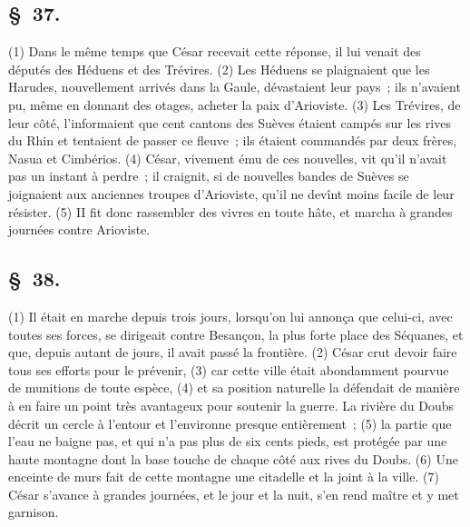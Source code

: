 \documentclass[french,twoside]{book} %
\begin{document}
\subsection[{§ 37.}]{ \textsc{§ 37.} }
\noindent (1) Dans le même temps que César recevait cette réponse, il lui venait des députés des Héduens et des Trévires. (2) Les Héduens se plaignaient que les Harudes, nouvellement arrivés dans la Gaule, dévastaient leur pays ; ils n’avaient pu, même en donnant des otages, acheter la paix d’Arioviste. (3) Les Trévires, de leur côté, l’informaient que cent cantons des Suèves étaient campés sur les rives du Rhin et tentaient de passer ce fleuve ; ils étaient commandés par deux frères, Nasua et Cimbérios. (4) César, vivement ému de ces nouvelles, vit qu’il n’avait pas un instant à perdre ; il craignit, si de nouvelles bandes de Suèves se joignaient aux anciennes troupes d’Arioviste, qu’il ne devînt moins facile de leur résister. (5) II fit donc rassembler des vivres en toute hâte, et marcha à grandes journées contre Arioviste.
\subsection[{§ 38.}]{ \textsc{§ 38.} }
\noindent (1) Il était en marche depuis trois jours, lorsqu’on lui annonça que celui-ci, avec toutes ses forces, se dirigeait contre Besançon, la plus forte place des Séquanes, et que, depuis autant de jours, il avait passé la frontière. (2) César crut devoir faire tous ses efforts pour le prévenir, (3) car cette ville était abondamment pourvue de munitions de toute espèce, (4) et sa position naturelle la défendait de manière à en faire un point très avantageux pour soutenir la guerre. La rivière du Doubs décrit un cercle à l’entour et l’environne presque entièrement ; (5) la partie que l’eau ne baigne pas, et qui n’a pas plus de six cents pieds, est protégée par une haute montagne dont la base touche de chaque côté aux rives du Doubs. (6) Une enceinte de murs fait de cette montagne une citadelle et la joint à la ville. (7) César s’avance à grandes journées, et le jour et la nuit, s’en rend maître et y met garnison.
\end{document}
